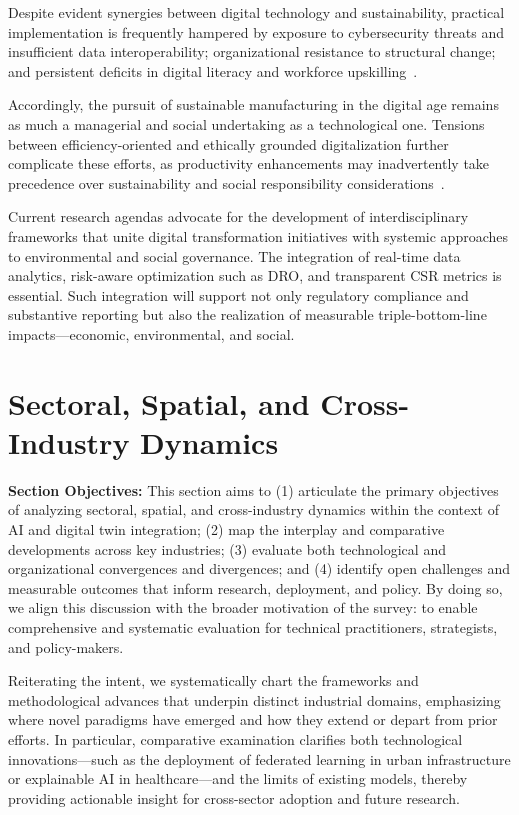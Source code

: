 \documentclass[sigconf]{acmart}
\begin{document}
Despite evident synergies between digital technology and sustainability, practical implementation is frequently hampered by exposure to cybersecurity threats and insufficient data interoperability; organizational resistance to structural change; and persistent deficits in digital literacy and workforce upskilling~\cite{ref18}\cite{ref29}\cite{ref40}.

Accordingly, the pursuit of sustainable manufacturing in the digital age remains as much a managerial and social undertaking as a technological one. Tensions between efficiency-oriented and ethically grounded digitalization further complicate these efforts, as productivity enhancements may inadvertently take precedence over sustainability and social responsibility considerations~\cite{ref85}.

Current research agendas advocate for the development of interdisciplinary frameworks that unite digital transformation initiatives with systemic approaches to environmental and social governance. The integration of real-time data analytics, risk-aware optimization such as DRO, and transparent CSR metrics is essential. Such integration will support not only regulatory compliance and substantive reporting but also the realization of measurable triple-bottom-line impacts—economic, environmental, and social.

\section{Sectoral, Spatial, and Cross-Industry Dynamics}

\textbf{Section Objectives:} This section aims to (1) articulate the primary objectives of analyzing sectoral, spatial, and cross-industry dynamics within the context of AI and digital twin integration; (2) map the interplay and comparative developments across key industries; (3) evaluate both technological and organizational convergences and divergences; and (4) identify open challenges and measurable outcomes that inform research, deployment, and policy. By doing so, we align this discussion with the broader motivation of the survey: to enable comprehensive and systematic evaluation for technical practitioners, strategists, and policy-makers.

Reiterating the intent, we systematically chart the frameworks and methodological advances that underpin distinct industrial domains, emphasizing where novel paradigms have emerged and how they extend or depart from prior efforts. In particular, comparative examination clarifies both technological innovations—such as the deployment of federated learning in urban infrastructure or explainable AI in healthcare—and the limits of existing models, thereby providing actionable insight for cross-sector adoption and future research.
\end{document}
